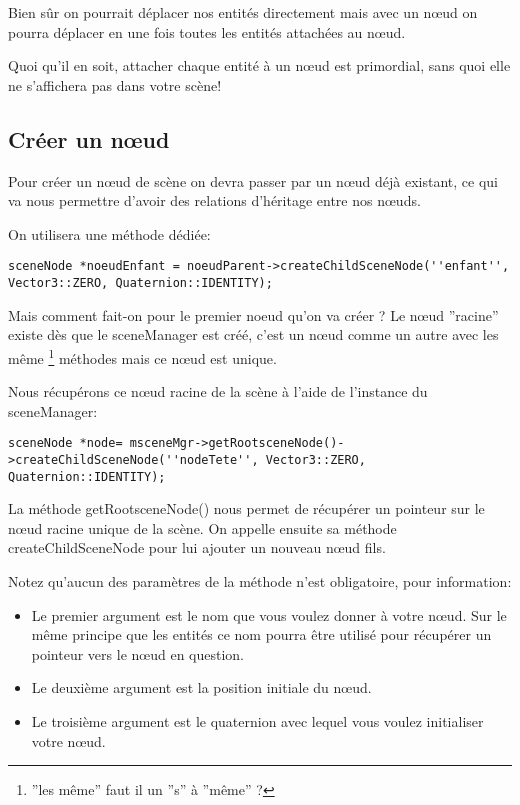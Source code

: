Bien sûr on pourrait déplacer nos entités directement mais avec un nœud on pourra déplacer en une fois toutes les entités attachées au nœud.

Quoi qu'il en soit, attacher chaque entité à un nœud est primordial, sans quoi elle ne s'affichera pas dans votre scène!



\subsection{Créer un nœud}

Pour créer un nœud de scène on devra passer par un nœud déjà existant, ce qui va nous permettre d'avoir des relations d'héritage entre nos nœuds.\newline

On utilisera une méthode dédiée:

\begin{lstlisting}
sceneNode *noeudEnfant = noeudParent->createChildSceneNode(''enfant'', Vector3::ZERO, Quaternion::IDENTITY);
\end{lstlisting}


Mais comment fait-on pour le premier noeud qu'on va créer ? Le nœud ''racine'' existe dès que le sceneManager est créé, c'est un nœud comme un autre avec les même \footnote{''les même'' faut il un ''s'' à ''même'' ?} méthodes mais ce nœud est unique.\newline

Nous récupérons ce nœud racine de la scène  à l'aide de l'instance du sceneManager:
\begin{lstlisting}
sceneNode *node= msceneMgr->getRootsceneNode()->createChildSceneNode(''nodeTete'', Vector3::ZERO, Quaternion::IDENTITY);
\end{lstlisting}

La méthode getRootsceneNode() nous permet de récupérer un pointeur sur le nœud racine unique de la scène. On appelle ensuite sa méthode createChildSceneNode pour lui ajouter un nouveau nœud fils.

Notez qu'aucun des paramètres de la méthode n'est obligatoire, pour information:
\begin{itemize}
\item Le premier argument est le nom que vous voulez donner à votre nœud. Sur le même principe que les entités ce nom pourra être utilisé pour récupérer un pointeur vers le nœud en question. 
\item Le deuxième argument est la position initiale du nœud.
\item Le troisième argument est le quaternion avec lequel vous voulez initialiser votre nœud.
\end{itemize}
	


